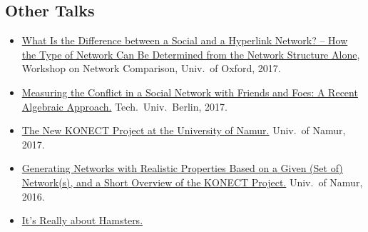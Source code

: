 \documentclass[line,mm]{res}
\newcounter{x}
\newcounter{y}
\newcommand{\talknumber}{T\arabic{y}\stepcounter{y}}
\begin{document}
\begin{resume}
\section{Other Talks}
\begin{itemize}
  \item[{[\talknumber]}]
    \href{https://www.slideshare.net/kunegis/title-what-is-the-difference-between-a-social-and-a-hyperlink-network-how-the-type-of-network-can-be-determined-from-the-network-structure-alone}{What Is the Difference between a Social and a Hyperlink Network?
    -- How the Type of Network Can Be Determined from the Network Structure
    Alone}, Workshop on Network Comparison, 
    Univ.\ of Oxford, 2017.   
  \item[{[\talknumber]}]
    \href{https://www.slideshare.net/kunegis/measuring-the-conflict-in-a-social-network-with-friends-and-foes-a-recent-algebraic-approach}{Measuring the Conflict in a Social Network with Friends and Foes:  A
    Recent Algebraic Approach.}
    Tech.\ Univ.\ Berlin, 2017. 
  \item[{[\talknumber]}] 
    \href{https://github.com/kunegis/pdfs/blob/master/kunegis:konect-namur.presentation.pdf}{The
      New KONECT Project at the University of Namur.}
    Univ.\ of Namur, 2017. 
  \item[{[\talknumber]}] 
    \href{https://github.com/kunegis/pdfs/blob/master/kunegis:graph-generator-namur.presentation.pdf}{Generating
      Networks with Realistic Properties Based on a 
    Given (Set of) Network(s), and a Short Overview of the KONECT
    Project.}  Univ.\ of Namur, 2016. 
  \item[{[\talknumber]}]
    \href{https://www.slideshare.net/kunegis/science-slam-by-jrme-kunegis-icwsm-2016}{It's Really about Hamsters.}

\end{itemize}
\end{resume}
\end{document}

